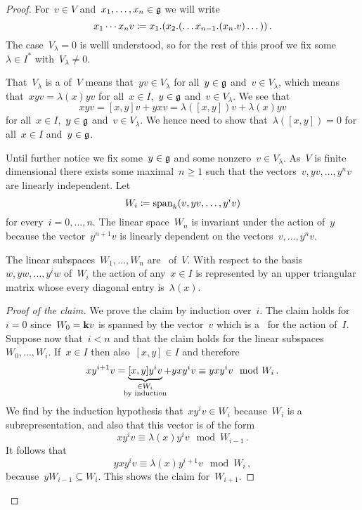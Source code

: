 \begin{proof}
  For~$v \in V$ and~$x_1, \dotsc, x_n \in \mathfrak{g}$ we will write
  \[
    x_1 \dotsm x_n v
    \coloneqq
    x_1.(x_2.( \dotsc x_{n-1}.(x_n.v) \dotsc )) \,.
  \]
  The case~$V_\lambda = 0$ is welll understood, so for the rest of this proof we fix some~$\lambda \in I^*$ with~$V_\lambda \neq 0$.
 
  That~$V_\lambda$ is a {\subrepresentation{$\glie$}} of~$V$ means that~$yv \in V_\lambda$ for all~$y \in \mathfrak{g}$ and~$v \in V_\lambda$, which  means that~$xyv = \lambda(x)yv$ for all~$x \in I$,~$y \in \mathfrak{g}$ and~$v \in V_\lambda$.
  We see that
  \[
    xyv
    =
    [x,y]v + yxv
    =
    \lambda([x,y])v + \lambda(x)yv
  \]
  for all~$x \in I$,~$y \in \mathfrak{g}$ and~$v \in V_\lambda$.
  We hence need to show that~$\lambda([x,y]) = 0$ for all~$x \in I$ and~$y \in \mathfrak{g}$.
 
  Until further notice we fix some~$y \in \mathfrak{g}$ and some nonzero~$v \in V_\lambda$.
  As~$V$ is finite dimensional there exists some maximal~$n \geq 1$ such that the vectors~$v, yv, \dotsc, y^n v$ are linearly independent.
  Let
  \[
    W_i
    \coloneqq
    \operatorname{span}_k(v, yv, \dotsc, y^i v)
  \]
  for every~$i = 0, \dotsc, n$.
  The linear space~$W_n$ is invariant under the action of~$y$ because the vector~$y^{n+1} v$ is linearly dependent on the vectors~$v, \dotsc, y^n v$.
 
  \begin{claim*}
    The linear subspaces~$W_1, \dotsc, W_n$ are~{} of~$V$.
    With respect to the basis~$w, y w, \dotsc, y^i w$ of~$W_i$ the action of any~$x \in I$ is represented by an upper triangular matrix whose every diagonal entry is~$\lambda(x)$.
  \end{claim*}

 \begin{proof}[Proof of the claim]
    We prove the claim by induction over~$i$.
    The claim holds for~$i = 0$ since~$W_0 = \mathbf{k} v$ is spanned by the vector~$v$ which is a~{\weightvector{$\lambda$}} for the action of~$I$.
    Suppose now that~$i < n$ and that the claim holds for the linear subspaces~$W_0, \dotsc, W_i$.
    If~$x \in I$ then also~$[x,y] \in I$ and therefore
    \[
      x y^{i+1} v
      =
      \underbrace{[x,y] y^i v}_{\mathclap{\substack{\in W_i \\ \text{by induction}}}} + y x y^i v
      \equiv
      y x y^i v
      \mod
      W_i \,.
    \]
    We find by the induction hypothesis that~$x y^i v \in W_i$ because~$W_i$ is a subrepresentation, and also that this vector is of the form
    \[
      x y^i v
      \equiv
      \lambda(x) y^i v
      \mod
      W_{i-1} \,.
    \]
    It follows that
    \[
      y x y^i v
      \equiv
      \lambda(x) y^{i+1} v
      \mod W_i  \,,
    \]
    because~$y W_{i-1} \subseteq W_i$.
    This shows the claim for~$W_{i+1}$.
 \end{proof}
  

\end{proof}

